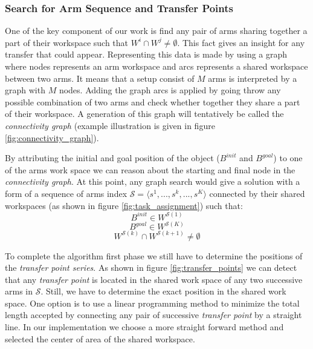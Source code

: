\documentclass[english]{article}
\theoremstyle{definition}
\begin{document}
\subsubsection*{Search for Arm Sequence and Transfer Points}

One of the key component of our work is find any pair of arms sharing together a part of their workspace such that $W^i \cap W^j \neq \emptyset$. This fact gives an insight for any transfer that could appear. Representing this data is made by using a graph where nodes represents an arm workspace and arcs represents a shared workspace between two arms. It means that a setup consist of $M$ arms is interpreted by a graph with $M$ nodes. Adding the graph arcs is applied by 
going throw any possible combination of two arms and check whether together they share a part of their workspace. A generation of this graph will tentatively be called the \textit{connectivity graph} (example illustration is given in figure \ref{fig:connectivity_graph}).

By attributing the initial and goal position of the object ($B^{init}$ and $B^{goal}$) to one of the arms work space we can reason about the starting and final node in the \textit{connectivity graph}. At this point, any graph search would give a solution with a form of a sequence of arms index $\mathcal{S} = \langle s^1,...,s^k,...,s^K \rangle$ connected by their shared workspaces (as shown in figure \ref{fig:task_assignment}) such that:
\begin{equation}
B^{init} \in W^{\mathcal{S}(1)}
\end{equation}
\begin{equation}
B^{goal} \in W^{\mathcal{S}(K)}
\end{equation}
\begin{equation}
W^{\mathcal{S}(k)}\cap W^{\mathcal{S}(k+1)}\neq \emptyset
\end{equation}

To complete the algorithm first phase we still have to determine the positions of the \textit{transfer point series}. As shown in figure \ref{fig:transfer_points} we can detect that any \textit{transfer point} is located in the shared work space of any two successive arms in $\mathcal{S}$. Still, we have to determine the exact position in the shared work space. One option is to use a linear programming method to minimize the total length accepted by connecting any pair of successive \textit{transfer point} by a straight line. In our implementation we choose a more straight forward method and selected the center of area of the shared workspace.
\end{document}
